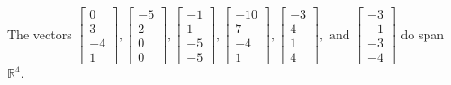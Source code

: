 \begin{exercise}
\begin{exerciseStatement}
  \end{exerciseStatement}
  \begin{exerciseAnswer}
   The vectors \(\left[\begin{array}{r}
0 \\
3 \\
-4 \\
1
\end{array}\right] , \left[\begin{array}{r}
-5 \\
2 \\
0 \\
0
\end{array}\right] , \left[\begin{array}{r}
-1 \\
1 \\
-5 \\
-5
\end{array}\right] , \left[\begin{array}{r}
-10 \\
7 \\
-4 \\
1
\end{array}\right] , \left[\begin{array}{r}
-3 \\
4 \\
1 \\
4
\end{array}\right] , \text{ and } \left[\begin{array}{r}
-3 \\
-1 \\
-3 \\
-4
\end{array}\right]\) 
  	 do  
	span \(\mathbb{R}^4\).
  


  \end{exerciseAnswer}
\end{exercise}